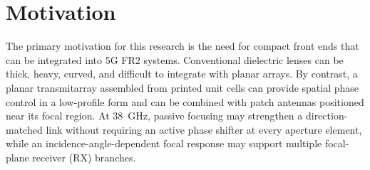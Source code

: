 

\section{Motivation}
The primary motivation for this research is the need for compact front ends that can be integrated into 5G FR2 systems. Conventional dielectric lenses can be thick, heavy, curved, and difficult to integrate with planar arrays. By contrast, a planar transmitarray assembled from printed unit cells can provide spatial phase control in a low-profile form and can be combined with patch antennas positioned near its focal region. At 38~GHz, passive focusing may strengthen a direction-matched link without requiring an active phase shifter at every aperture element, while an incidence-angle-dependent focal response may support multiple focal-plane receiver (RX) branches.

